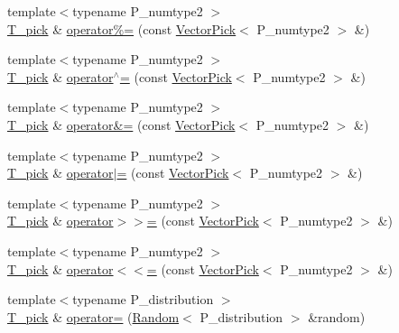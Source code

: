 \begin{DoxyCompactItemize}
\item 
{\footnotesize template$<$typename P\+\_\+numtype2 $>$ }\\\hyperlink{classVectorPick_ab257fd713ce0f2a81bc79059cec93ac9}{T\+\_\+pick} \& \hyperlink{classVectorPick_a764d8ac3a7668e395f38499692159073}{operator\%=} (const \hyperlink{classVectorPick}{Vector\+Pick}$<$ P\+\_\+numtype2 $>$ \&)
\item 
{\footnotesize template$<$typename P\+\_\+numtype2 $>$ }\\\hyperlink{classVectorPick_ab257fd713ce0f2a81bc79059cec93ac9}{T\+\_\+pick} \& \hyperlink{classVectorPick_add1ad8b6984b886eb2524182e36e8fe2}{operator$^\wedge$=} (const \hyperlink{classVectorPick}{Vector\+Pick}$<$ P\+\_\+numtype2 $>$ \&)
\item 
{\footnotesize template$<$typename P\+\_\+numtype2 $>$ }\\\hyperlink{classVectorPick_ab257fd713ce0f2a81bc79059cec93ac9}{T\+\_\+pick} \& \hyperlink{classVectorPick_a6109ae65f0d02fb606b39c6c5b017ba5}{operator\&=} (const \hyperlink{classVectorPick}{Vector\+Pick}$<$ P\+\_\+numtype2 $>$ \&)
\item 
{\footnotesize template$<$typename P\+\_\+numtype2 $>$ }\\\hyperlink{classVectorPick_ab257fd713ce0f2a81bc79059cec93ac9}{T\+\_\+pick} \& \hyperlink{classVectorPick_a0b3269c52d6fc9dcca9a539e56d78441}{operator$\vert$=} (const \hyperlink{classVectorPick}{Vector\+Pick}$<$ P\+\_\+numtype2 $>$ \&)
\item 
{\footnotesize template$<$typename P\+\_\+numtype2 $>$ }\\\hyperlink{classVectorPick_ab257fd713ce0f2a81bc79059cec93ac9}{T\+\_\+pick} \& \hyperlink{classVectorPick_a1eaf40a5d031feb3733bb9aca3919a0f}{operator$>$$>$=} (const \hyperlink{classVectorPick}{Vector\+Pick}$<$ P\+\_\+numtype2 $>$ \&)
\item 
{\footnotesize template$<$typename P\+\_\+numtype2 $>$ }\\\hyperlink{classVectorPick_ab257fd713ce0f2a81bc79059cec93ac9}{T\+\_\+pick} \& \hyperlink{classVectorPick_a5e89bedcb8c7fb409964aeb052cd01b2}{operator$<$$<$=} (const \hyperlink{classVectorPick}{Vector\+Pick}$<$ P\+\_\+numtype2 $>$ \&)
\item 
{\footnotesize template$<$typename P\+\_\+distribution $>$ }\\\hyperlink{classVectorPick_ab257fd713ce0f2a81bc79059cec93ac9}{T\+\_\+pick} \& \hyperlink{classVectorPick_a492e93939b5ca5e092a57f9d474805c3}{operator=} (\hyperlink{classRandom}{Random}$<$ P\+\_\+distribution $>$ \&random)

\end{DoxyCompactItemize}
